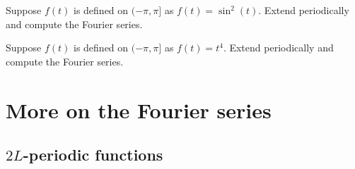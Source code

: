 \begin{exercise}
Suppose $f(t)$ is defined on $(-\pi,\pi]$ as $f(t) = \sin^2(t)$.
Extend
periodically and compute the Fourier series.
\end{exercise}

\begin{exercise}
Suppose $f(t)$ is defined on $(-\pi,\pi]$ as $f(t) = t^4$.
Extend periodically and compute the Fourier series.
\end{exercise}


\sectionnewpage
\section{More on the Fourier series}
\label{moreonfourier:section}




\subsection{$2L$-periodic functions}

